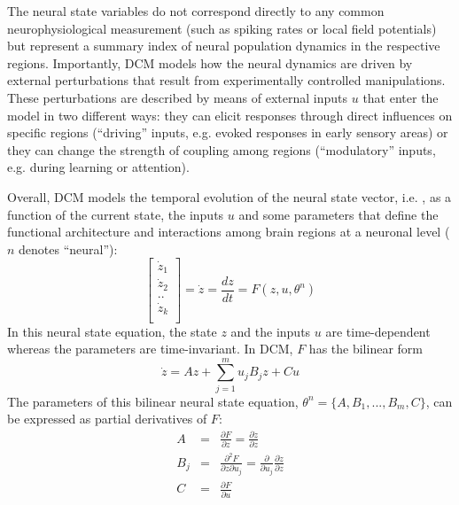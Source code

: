 The neural state variables do not correspond directly to any common neurophysiological measurement (such as spiking rates or local field potentials) but represent a summary index of neural population dynamics in the respective regions.  Importantly, DCM models how the neural dynamics are driven by external perturbations that result from experimentally controlled manipulations.  These perturbations are described by means of external inputs $u$ that enter the model in two different ways:  they can elicit responses through direct influences on specific regions (``driving'' inputs, e.g. evoked responses in early sensory areas) or they can change the strength of coupling among regions (``modulatory'' inputs, e.g. during learning or attention).

Overall, DCM models the temporal evolution of the neural state vector, i.e. , as a function of the current state, the inputs $u$ and some parameters  that define the functional architecture and interactions among brain regions at a neuronal level ($n$  denotes ``neural''):
\begin{equation}
\left[ \begin{array}{l}
  \dot{z}_1 \\
  \dot{z}_2 \\
  .. \\
  \dot{z}_k \\  \end{array} \right] = \dot{z}= \frac{dz}{dt} = F(z,u,\theta^n)
\end{equation}
In this neural state equation, the state $z$ and the inputs $u$ are time-dependent whereas the parameters are time-invariant. In DCM, $F$ has the bilinear form
 \begin{equation}
\dot{z}=Az+\sum_{j=1}^m u_j B_j z + Cu
\end{equation}
The parameters of this bilinear neural state equation, $\theta^n=\{A,B_1,...,B_m,C\}$, can be expressed as partial derivatives of $F$:
\begin{eqnarray}
A & = & \frac{\partial F}{\partial z} = \frac{\partial \dot{z}}{\partial z} \\ \nonumber
B_j & = & \frac{\partial^2 F}{\partial z \partial u_j} = \frac{\partial}{\partial u_j}\frac{\partial \dot{z}}{\partial z}  \\ \nonumber
C & = & \frac{\partial F}{\partial u}
\end{eqnarray}
